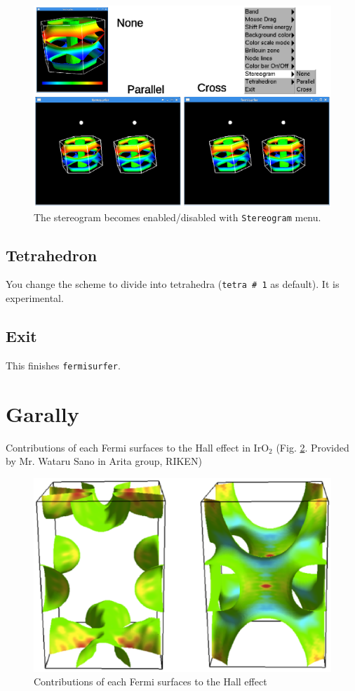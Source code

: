 \documentclass[12pt]{article}
\begin{document}
\begin{figure}[!ht]
  \includegraphics[width=17cm]{figs/stereogram.eps}
  \caption{The stereogram becomes enabled/disabled with \texttt{Stereogram} menu.}
  \label{fig_stereogram}
\end{figure}

\subsection{Tetrahedron}

You change the scheme to divide into tetrahedra (\texttt{tetra \# 1} as default).
It is experimental.

\subsection{Exit}

This finishes \verb|fermisurfer|.

\section{Garally}

Contributions of each Fermi surfaces to the Hall effect
in IrO$_2$
(Fig. \ref{fig_iro2}. Provided by Mr. Wataru Sano in Arita group, RIKEN)

\begin{figure}[!ht]
  \includegraphics[width=17cm]{figs/iro2.eps}
  \caption{Contributions of each Fermi surfaces to the Hall effect}
  \label{fig_iro2}
\end{figure}
\end{document}
